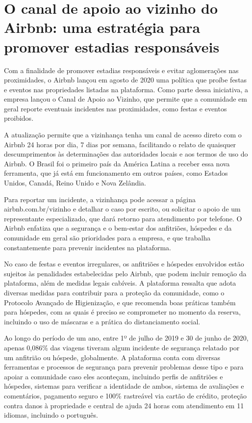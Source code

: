 \documentclass{article}
\begin{document}
\section*{O canal de apoio ao vizinho do Airbnb: uma estratégia para promover estadias responsáveis}

Com a finalidade de promover estadias responsáveis e evitar aglomerações nas proximidades, o Airbnb lançou em agosto de 2020 uma política que proíbe festas e eventos nas propriedades listadas na plataforma. Como parte dessa iniciativa, a empresa lançou o Canal de Apoio ao Vizinho, que permite que a comunidade em geral reporte eventuais incidentes nas proximidades, como festas e eventos proibidos.

A atualização permite que a vizinhança tenha um canal de acesso direto com o Airbnb 24 horas por dia, 7 dias por semana, facilitando o relato de quaisquer descumprimentos às determinações das autoridades locais e aos termos de uso do Airbnb. O Brasil foi o primeiro país da América Latina a receber essa nova ferramenta, que já está em funcionamento em outros países, como Estados Unidos, Canadá, Reino Unido e Nova Zelândia.

Para reportar um incidente, a vizinhança pode acessar a página airbnb.com.br/vizinho e detalhar o caso por escrito, ou solicitar o apoio de um representante especializado, que dará retorno para atendimento por telefone. O Airbnb enfatiza que a segurança e o bem-estar dos anfitriões, hóspedes e da comunidade em geral são prioridades para a empresa, e que trabalha constantemente para prevenir incidentes na plataforma.

No caso de festas e eventos irregulares, os anfitriões e hóspedes envolvidos estão sujeitos às penalidades estabelecidas pelo Airbnb, que podem incluir remoção da plataforma, além de medidas legais cabíveis. A plataforma ressalta que adota diversas medidas para contribuir para a proteção da comunidade, como o Protocolo Avançado de Higienização, e que recomenda boas práticas também para hóspedes, com as quais é preciso se comprometer no momento da reserva, incluindo o uso de máscaras e a prática do distanciamento social.

Ao longo do período de um ano, entre 1º de julho de 2019 e 30 de junho de 2020, apenas 0,086\% das viagens tiveram algum incidente de segurança relatado por um anfitrião ou hóspede, globalmente. A plataforma conta com diversas ferramentas e processos de segurança para prevenir problemas desse tipo e para apoiar a comunidade caso eles aconteçam, incluindo perfis de anfitriões e hóspedes, sistemas para verificar a identidade de ambos, sistema de avaliações e comentários, pagamento seguro e 100\% rastreável via cartão de crédito, proteção contra danos à propriedade e central de ajuda 24 horas com atendimento em 11 idiomas, incluindo o português.
\end{document}
